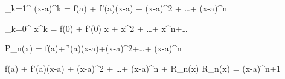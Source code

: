 \sum_{k=1}^\infty {} (x-a)^k = f(a) + f'(a)(x-a) +  (x-a)^2 + \ldots +  (x-a)^n 

\sum_{k=0}^\infty {} x^k = f(0) + f'(0) x + x^2 + \ldots + x^n+\ldots

P_n(x) = f(a)+f'(a)(x-a)+(x-a)^2+\ldots + (x-a)^n

f(a) + f'(a)(x-a) +  (x-a)^2 + \ldots +  (x-a)^n + R_n(x) 
R_n(x) = (x-a)^{n+1}

